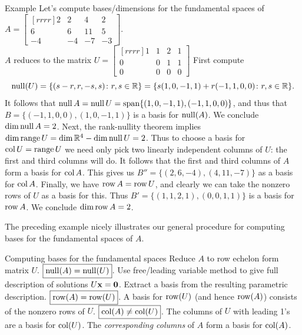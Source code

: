 \begin{frame}{Example}
\footnotesize
Let's compute bases/dimensions for the fundamental spaces of \\ 
$A=\begin{bmatrix}[rrrr]
2&2&4&2\\
6&6&11&5\\
-4&-4&-7&-3
\end{bmatrix}
$.\\
\pause $A$ reduces to the matrix 
$U=\begin{bmatrix}[rrrr]
1&1&2&1\\
0&0&1&1\\
0&0&0&0
\end{bmatrix}
$
\bpause
First compute 
\[
\operatorname{null}(U)=\{(s-r,r,-s,s)\colon r, s\in{\mathbb R}\}=\{s(1,0,-1,1)+r(-1,1,0,0)\colon r,s\in{\mathbb R}\}.
\]
It follows that $\operatorname{null} A=\operatorname{null} U=\operatorname{span} \{(1,0,-1,1), (-1,1,0,0)\}$, and thus that $B=\{(-1,1,0,0), (1,0,-1,1)\}$ is a basis for $\operatorname{null}(A)$. We conclude $\dim\operatorname{null} A=2$. 
\bpause Next, the rank-nullity theorem implies $\dim\operatorname{range} U=\dim {\mathbb R}^4-\dim\operatorname{null} U=2$. Thus to choose a basis for $\operatorname{col} U=\operatorname{range} U$ we need only pick two linearly independent columns of $U$:  the first and third columns will do. It follows that the first and third columns of $A$ form a basis for $\operatorname{col} A$. This gives us $B''=\{(2,6,-4), (4,11,-7)\}$ as a basis for $\operatorname{col} A $. 
\bpause
Finally, we have $\operatorname{row} A =\operatorname{row} U$, and clearly we can take the nonzero rows of $U$ as a basis for this. Thus $B'=\{(1,1,2,1),(0,0,1,1)\}$ is a basis for $\operatorname{row} A $. We conclude $\dim\operatorname{row} A=2$. 
\end{frame}
\begin{frame}
 The preceding example nicely illustrates our general procedure for computing bases for the fundamental spaces of $A$. 
 \begin{block}{Computing bases for the fundamental spaces}
\bb[(i)]
\ii Reduce $A$ to row echelon form matrix $U$. 
\ii $\boxed{\operatorname{null}(A)=\operatorname{null}(U)}$. Use free/leading variable method to give full description of solutions $U{\mathbf x}={\mathbf 0}$. Extract a basis from the resulting parametric description. 
\ii $\boxed{\operatorname{row}(A)=\operatorname{row}(U)}$. A basis for $\operatorname{row}(U)$ (and hence $\operatorname{row}(A)$) consists of the nonzero rows of $U$. 
\ii $\boxed{\operatorname{col}(A)\ne \operatorname{col}(U)}$. The columns of $U$ with leading 1's are a basis for $\operatorname{col}(U)$. The {\em corresponding columns} of $A$ form a basis for $\operatorname{col}(A)$. 
\ee
\end{block}
\pause

\end{frame}
